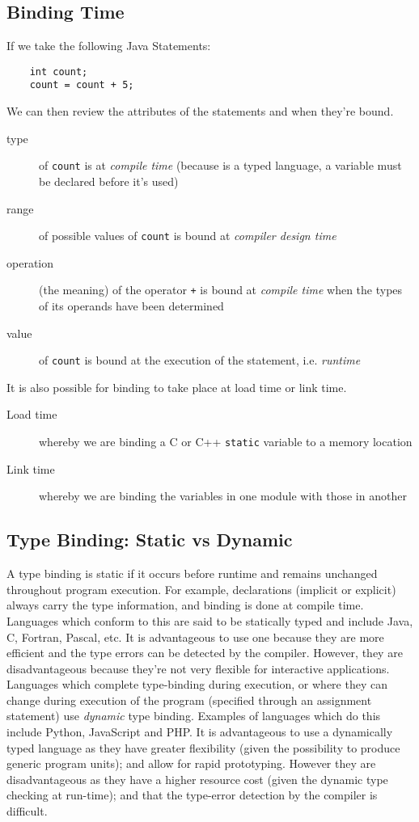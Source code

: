 \subsection{Binding Time}
If we take the following Java Statements:
\begin{verbatim}
    int count;
    count = count + 5;
\end{verbatim}
We can then review the attributes of the statements and when they're bound.
\begin{description}
    \item[type] of \verb|count| is at \textit{compile time} (because is a typed language, a variable must be declared before it's used)
    \item[range] of possible values of \verb|count| is bound at \textit{compiler design time} 
    \item[operation] (the meaning) of the operator \verb|+| is bound at \textit{compile time} when the types of its operands have been determined
    \item[value] of \verb|count| is bound at the execution of the statement, i.e. \textit{runtime}
\end{description}

It is also possible for binding to take place at load time or link time.
\begin{description}
    \item[Load time] whereby we are binding a C or C++ \verb|static| variable to a memory location
    \item[Link time] whereby we are binding the variables in one module with those in another
\end{description}

\subsection{Type Binding: Static vs Dynamic}
A type binding is static if it occurs before runtime and remains unchanged throughout program execution. For example, declarations (implicit or explicit) always carry the type information, and binding is done at compile time. Languages which conform to this are said to be statically typed and include Java, C, Fortran, Pascal, etc. It is advantageous to use one because they are more efficient and the type errors can be detected by the compiler. However, they are disadvantageous because they're not very flexible for interactive applications.\\

Languages which complete type-binding during execution, or where they can change during execution of the program (specified through an assignment statement) use \textit{dynamic} type binding. Examples of languages which do this include Python, JavaScript and PHP. It is advantageous to use a dynamically typed language as they have greater flexibility (given the possibility to produce generic program units); and allow for rapid prototyping. However they are disadvantageous as they have a higher resource cost (given the dynamic type checking at run-time); and that the type-error detection by the compiler is difficult.

